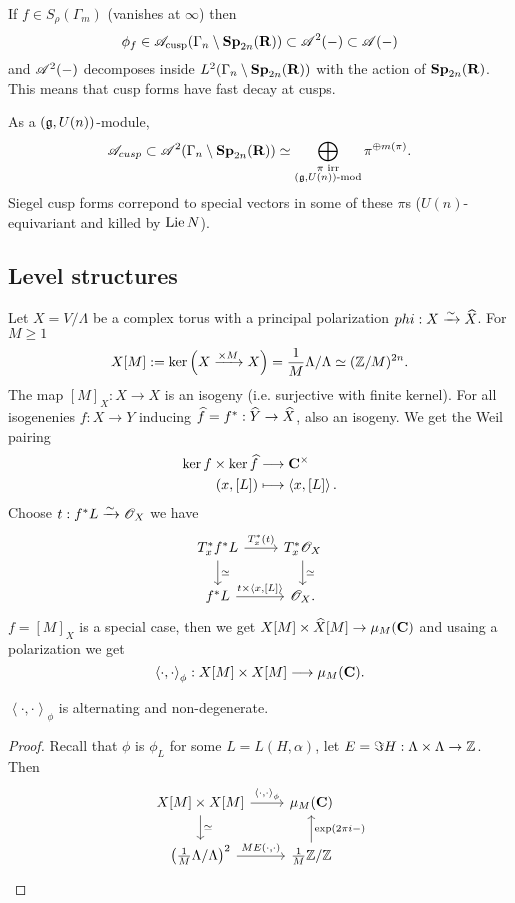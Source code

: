 	If $f\in S_\rho(\Gamma_m)$ (vanishes at $\infty$) then
	\[
		\phi_f\in \mathscr{A}_{\text{cusp}}(\Gamma_n\setminus\mathbf{Sp}_{2n}(\mathbf{R})) \subset \mathscr{A}^2(-) \subset \mathscr{A}(-)
	\]
	and $\mathscr{A}^2(-)$ decomposes inside $L^2(\Gamma_n\setminus\mathbf{Sp}_{2n}(\mathbf{R}))$ with the action of
	$\mathbf{Sp}_{2n}(\mathbf{R})$. This means that cusp forms have fast decay at cusps.

	As a $(\mathfrak{g},U(n))$-module,
	\[
		\mathscr{A}_{cusp}\subset \mathscr{A}^2(\Gamma_n\setminus\mathbf{Sp}_{2n}(\mathbf{R})) \simeq
		\bigoplus_{\substack{\pi\text{ irr} \\ (\mathfrak{g},U(n))\text{-mod}}}\pi^{\oplus m(\pi)}.
	\]
	Siegel cusp forms correpond to special vectors in some of these $\pi$s
	($U(n)$-equivariant and killed by $\operatorname{Lie} N$).

	\subsection{Level structures}
	Let $X = V /\Lambda$ be a complex torus with a principal polarization $phi:X\xrightarrow{\sim}
	\widehat{X}$. For $M\ge 1$
	\[
		X[M] := \operatorname{ker}\left( X\xrightarrow{\times M}X \right) = \frac{1}{M}\Lambda /\Lambda
		\simeq (\mathbb Z /M)^{2n}.
	\]
	The map $[M]_X:X\to X$ is an isogeny (i.e. surjective with finite kernel). For all
	isogenenies $f:X\to Y$ inducing $\wh{f}=f^{*}:\wh{Y}\to \wh{X}$, also an isogeny. We get
	the Weil pairing
	\begin{align*}
		\operatorname{ker} f\times \operatorname{ker}\widehat{f} &\longrightarrow \mathbf{C}^{\times} \\
		(x,[L]) &\longmapsto \left<x,[L] \right>
		.
	\end{align*}
	Choose $t:f^{*}L\xrightarrow{\sim} \mathscr{O}_X$ we have
	\[
		\begin{tikzcd}
			T_x^{*}f^{*}L \ar[r,"{T_x^{*}(t)}"] \ar[d,"\isoto"] & T_x^{*}\OO_X \ar[d,"\isoto"] \\
			f^{*}L \ar[r,"{t\times \left<x,[L] \right>}"] & \OO_X.
		\end{tikzcd}
	\]
	$f=[M]_X$ is a special case, then we get $X[M]\times \wh{X}[M]\to \mu_M(\C)$ and usaing
	a polarization we get
	\[
		\left<\cdot ,\cdot  \right>_\phi:X[M]\times X[M]\to \mu_M(\C).
	\]
	\begin{proposition}
		$\left<\cdot ,\cdot  \right>_\phi$ is alternating and non-degenerate.
	\end{proposition}
	\begin{proof}
		Recall that $\phi$ is $\phi_L$ for some $L=L(H,\alpha)$, let $E=\Im H:\Lambda\times
		\Lambda\to \Z$. Then
		\[
			\begin{tikzcd}
				X[M] \times X[M] \ar[r,"{\left<\cdot ,\cdot  \right>_\phi}"] \ar[d,"\isoto"] & \mu_M(\C) \\
				\left( \frac{1}{M}\Lambda /\Lambda \right) ^2 \ar[r,"{ME(\cdot ,\cdot )}"] &
				\frac{1}{M}\Z /\Z \ar[u,"{\exp(2\pi i -)}"']
			\end{tikzcd}
		\]
	\end{proof}
